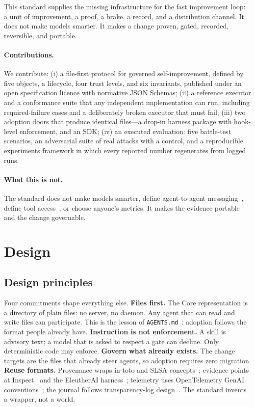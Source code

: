 \documentclass[10pt,twocolumn]{article}
\begin{document}
This standard supplies the missing infrastructure for the fast improvement
loop: a unit of improvement, a proof, a brake, a record, and a
distribution channel. It does not make models smarter. It makes a change
proven, gated, recorded, reversible, and portable.

\paragraph{Contributions.} We contribute: (i) a file-first protocol for
governed self-improvement, defined by five objects, a lifecycle, four trust
levels, and six invariants, published under an open specification licence
with normative JSON Schemas; (ii) a reference executor and a conformance
suite that any independent implementation can run, including
required-failure cases and a deliberately broken executor that must fail;
(iii) two adoption doors that produce identical files---a drop-in harness
package with hook-level enforcement, and an SDK; (iv) an executed
evaluation: five battle-test scenarios, an adversarial suite of real
attacks with a control, and a reproducible experiments framework in which
every reported number regenerates from logged runs.

\paragraph{What this is not.} The standard does not make models smarter,
define agent-to-agent messaging~\cite{a2a}, define tool access~\cite{mcp},
or choose anyone's metrics. It makes the evidence portable and the change
governable.

\section{Design}
\label{sec:design}

\subsection{Design principles}
Four commitments shape everything else.
\textbf{Files first.} The Core representation is a directory of plain
files: no server, no daemon. Any agent that can read and write files can
participate. This is the lesson of \texttt{AGENTS.md}~\cite{agentsmd}:
adoption follows the format people already have.
\textbf{Instruction is not enforcement.} A skill is advisory text; a
model that is asked to respect a gate can decline. Only deterministic code
may enforce.
\textbf{Govern what already exists.} The change targets are the files that
already steer agents, so adoption requires zero migration.
\textbf{Reuse formats.} Provenance wraps in-toto and SLSA
concepts~\cite{intoto,slsa}; evidence points at Inspect~\cite{inspect} and
the EleutherAI harness~\cite{lmeval}; telemetry uses OpenTelemetry GenAI
conventions~\cite{otelgenai}; the journal follows transparency-log
design~\cite{rfc6962}. The standard invents a wrapper, not a world.
\end{document}
